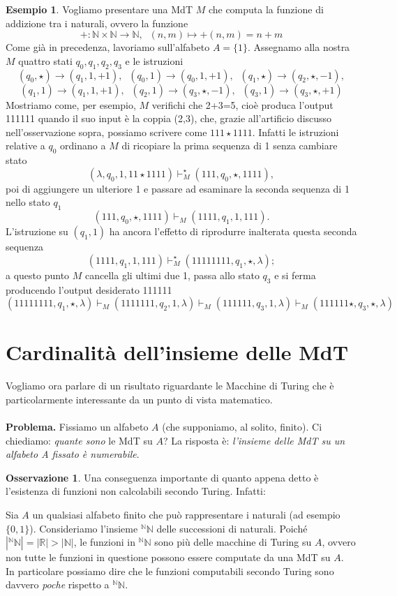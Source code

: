 \documentclass[12pt,a4paper]{report}
\theoremstyle{definition}
\newtheorem{es}[teo]{Esempio}  %
\newtheorem{oss}[teo]{Osservazione}  %
\begin{document}
\begin{es}
Vogliamo presentare una MdT $M$ che computa la funzione di addizione tra i naturali, ovvero la funzione 
$$+ : \mathbb{N} \times \mathbb{N} \longrightarrow \mathbb{N}, \; \; (n,m) \mapsto +(n,m) = n+m$$
Come già in precedenza, lavoriamo sull'alfabeto $A=\{1\}$. Assegnamo alla nostra $M$ quattro stati $q_0,q_1,q_2,q_3$ e le istruzioni 
$$(q_0,\star) \rightarrow (q_1,1,+1), \; \; (q_0,1) \rightarrow (q_0,1,+1), \; \; (q_1,\star) \rightarrow (q_2,\star,-1),$$
$$(q_1,1) \rightarrow (q_1,1,+1), \; \; (q_2,1) \rightarrow (q_3,\star,-1), \; \; (q_3,1) \rightarrow (q_3,\star,+1)$$
Mostriamo come, per esempio, $M$ verifichi che 2+3=5, cioè produca l'output 111111 quando il suo input è la coppia (2,3), che, grazie all'artificio discusso nell'osservazione sopra, possiamo scrivere come $111 \star 1111$. Infatti le istruzioni relative a $q_0$ ordinano a $M$ di ricopiare la prima sequenza di 1 senza cambiare stato
$$(\lambda,q_0,1,11 \star 1111) \vdash_M^{\star} (111,q_0,\star,1111),$$
poi di aggiungere un ulteriore 1 e passare ad esaminare la seconda sequenza di 1 nello stato $q_1$ 
$$(111,q_0,\star,1111) \vdash_M (1111,q_1,1,111).$$
L'istruzione su $(q_1,1)$ ha ancora l'effetto di riprodurre inalterata questa seconda sequenza
$$(1111,q_1,1,111) \vdash_M^{\star} (11111111,q_1,\star,\lambda);$$
a questo punto $M$ cancella gli ultimi due 1, passa allo stato $q_3$ e si ferma producendo l'output desiderato 111111
$$(11111111,q_1,\star,\lambda) \vdash_M (1111111,q_2,1,\lambda) \vdash_M (111111,q_3,1,\lambda) \vdash_M (111111 \star,q_3,\star,\lambda)$$
\end{es}


\section{Cardinalità dell'insieme delle MdT}

Vogliamo ora parlare di un risultato riguardante le Macchine di Turing che è particolarmente interessante da un punto di vista matematico.\\
\\
\noindent \textbf{Problema.} Fissiamo un alfabeto $A$ (che supponiamo, al solito, finito). Ci chiediamo: \emph{quante sono} le MdT su $A$? La risposta è: \emph{l'insieme delle MdT su un alfabeto A fissato è numerabile}.

\begin{oss}
Una conseguenza importante di quanto appena detto è l'esistenza di funzioni non calcolabili secondo Turing. Infatti:

Sia $A$ un qualsiasi alfabeto finito che può rappresentare i naturali (ad esempio $\{0,1\}$). Consideriamo l'insieme $^{\mathbb{N}}\mathbb{N}$ delle successioni di naturali. Poiché $|^{\mathbb{N}}\mathbb{N}| = |\mathbb{R}| > |\mathbb{N}|$, le funzioni in $^{\mathbb{N}}\mathbb{N}$ sono più delle macchine di Turing su $A$, ovvero non tutte le funzioni in questione possono essere computate da una MdT su $A$.\\
In particolare possiamo dire che le funzioni computabili secondo Turing sono davvero \emph{poche} rispetto a $^{\mathbb{N}}\mathbb{N}$.
\end{oss}
\end{document}
